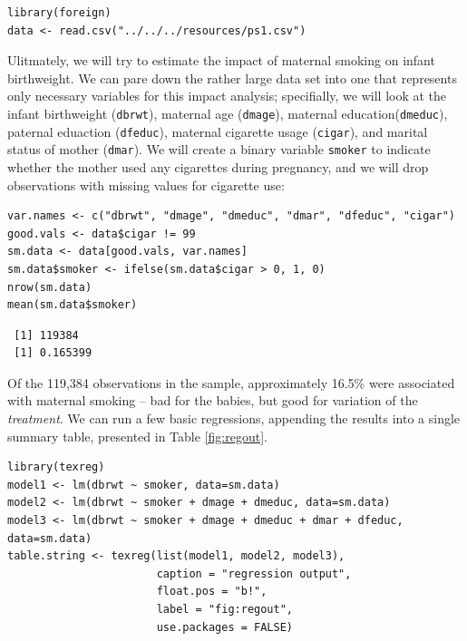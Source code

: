 \documentclass{article}
\begin{document}
\begin{verbatim}
library(foreign)
data <- read.csv("../../../resources/ps1.csv")
\end{verbatim}

Ulitmately, we will try to estimate the impact of maternal smoking on
infant birthweight.  We can pare down the rather large data set into
one that represents only necessary variables for this impact analysis;
specifially, we will look at the infant birthweight (\texttt{dbrwt}),
maternal age (\texttt{dmage}), maternal education(\texttt{dmeduc}), paternal
eduaction (\texttt{dfeduc}), maternal cigarette usage (\texttt{cigar}), and marital
status of mother (\texttt{dmar}).  We will create a binary variable \texttt{smoker}
to indicate whether the mother used any cigarettes during pregnancy,
and we will drop observations with missing values for cigarette use:


\begin{verbatim}
var.names <- c("dbrwt", "dmage", "dmeduc", "dmar", "dfeduc", "cigar")
good.vals <- data$cigar != 99
sm.data <- data[good.vals, var.names]
sm.data$smoker <- ifelse(sm.data$cigar > 0, 1, 0)
nrow(sm.data)
mean(sm.data$smoker)
\end{verbatim}

\begin{verbatim}
 [1] 119384
 [1] 0.165399
\end{verbatim}

Of the 119,384 observations in the sample, approximately 16.5\% were
associated with maternal smoking -- bad for the babies, but good for
variation of the \emph{treatment}.  We can run a few basic regressions,
appending the results into a single summary table, presented in Table
\ref{fig:regout}.


\begin{verbatim}
library(texreg)
model1 <- lm(dbrwt ~ smoker, data=sm.data)
model2 <- lm(dbrwt ~ smoker + dmage + dmeduc, data=sm.data)
model3 <- lm(dbrwt ~ smoker + dmage + dmeduc + dmar + dfeduc, data=sm.data)
table.string <- texreg(list(model1, model2, model3), 
                       caption = "regression output",
                       float.pos = "b!",
                       label = "fig:regout",
                       use.packages = FALSE)
\end{verbatim}
\end{document}
